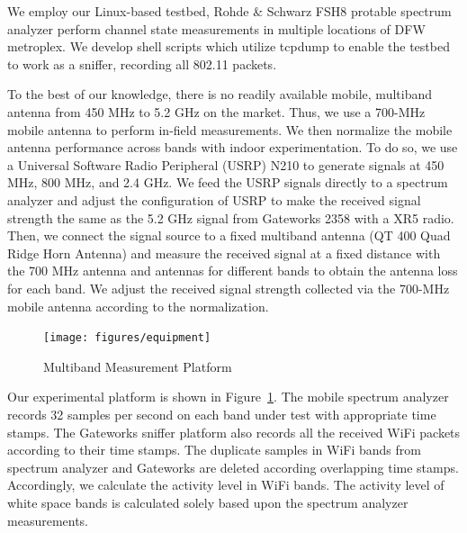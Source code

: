 We employ our Linux-based testbed, Rohde \& Schwarz FSH8 protable spectrum analyzer perform 
channel state measurements in multiple locations of DFW metroplex.
We develop shell scripts which utilize tcpdump to enable the testbed to
work as a sniffer, recording all 802.11 packets. 


To the best of our knowledge, there is no readily available mobile, multiband antenna from
450 MHz to 5.2 GHz on the market. Thus, we use a 700-MHz mobile antenna to perform in-field
measurements. We then normalize the mobile antenna performance across bands with indoor 
experimentation. To do so, we use a Universal Software Radio Peripheral (USRP) N210 to 
generate signals at 450 MHz, 800 MHz, and 2.4 GHz. We feed the USRP signals directly
to a spectrum analyzer and adjust the configuration of USRP to make the received signal 
strength the same as the 5.2 GHz signal from Gateworks 2358 with a XR5 radio. Then, we connect 
the signal source to a fixed multiband antenna (QT 400 Quad Ridge Horn Antenna) and measure the
received signal at a fixed distance with the 700 MHz antenna and antennas for different bands
to obtain the antenna loss for each band. We adjust the received signal strength
collected via the 700-MHz mobile antenna according to the normalization.

  \begin{figure}
  \centering
  \texttt{[image: figures/equipment]}
  \vspace{-0.1in}
  \caption{Multiband Measurement Platform}
  \label{fig:equipment}
  \end{figure}
  
Our experimental platform is shown in Figure~\ref{fig:equipment}.
The mobile spectrum analyzer records 32 samples per second on each band under test with 
appropriate time stamps.
The Gateworks sniffer platform also records all the received WiFi packets according to their time stamps. 
The duplicate samples in WiFi bands from spectrum analyzer and Gateworks are deleted 
according overlapping time stamps. Accordingly, we calculate the activity level in WiFi bands. 
The activity level of white space bands is calculated solely based upon the spectrum analyzer measurements.  

